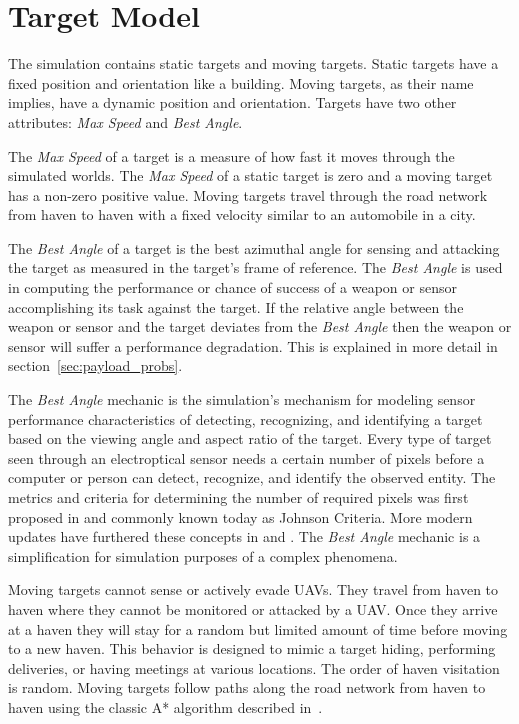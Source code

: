 \section{Target Model}
\label{sec:target_model}
The simulation contains static targets and moving targets.  Static targets have a fixed position and orientation like a building.  Moving targets, as their name implies, have a dynamic position and orientation.  Targets have two other attributes: \textit{Max Speed} and \textit{Best Angle}.

The \textit{Max Speed} of a target is a measure of how fast it moves through the simulated worlds.  The \textit{Max Speed} of a static target is zero and a moving target has a non-zero positive value.  Moving targets travel through the road network from haven to haven with a fixed velocity similar to an automobile in a city.

The \textit{Best Angle} of a target is the best azimuthal angle for sensing and attacking the target as measured in the target's frame of reference.  The \textit{Best Angle} is used in computing the performance or chance of success of a weapon or sensor accomplishing its task against the target.  If the relative angle between the weapon or sensor and the target deviates from the \textit{Best Angle} then the weapon or sensor will suffer a performance degradation.  This is explained in more detail in section~\ref{sec:payload_probs}.  

The \textit{Best Angle} mechanic is the simulation's mechanism for modeling sensor performance characteristics of detecting, recognizing, and identifying a target based on the viewing angle and aspect ratio of the target.  Every type of target seen through an electroptical sensor needs a certain number of pixels before a computer or person can detect, recognize, and identify the observed entity.  The metrics and criteria for determining the number of required pixels was first proposed in \textcite{johnson_criteria} and commonly known today as Johnson Criteria.  More modern updates have furthered these concepts in \textcite{sensor_perf} and \textcite{evolution_johnson_criteria}.  The \textit{Best Angle} mechanic is a simplification for simulation purposes of a complex phenomena.


Moving targets cannot sense or actively evade UAVs.  They travel from haven to haven where they cannot be monitored or attacked by a UAV.  Once they arrive at a haven they will stay for a random but limited amount of time before moving to a new haven.  This behavior is designed to mimic a target hiding, performing deliveries, or having meetings at various locations.  The order of haven visitation is random.  Moving targets follow paths along the road network from haven to haven using the classic A* algorithm described in~\textcite{astar}.

